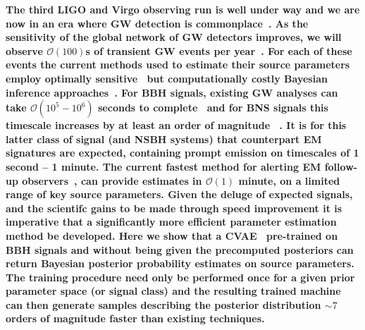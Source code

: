\documentclass[%
showpacs,
 amsmath,amssymb,
 aps,
 twocolumn,
 prl,
 reprint,
floatfix,
]{revtex4-1}
\begin{document}
%
%
%
\textbf{ 
%
%
The third \ac{LIGO} and Virgo observing run is well under way and we are now in
an era where \ac{GW} detection is commonplace~\cite{PhysRevLett.116.061102,
PhysRevX.6.041015,PhysRevLett.119.161101}. As the sensitivity of the global
network of \ac{GW} detectors improves, we will observe $\mathcal{O}(100)$s of
transient \ac{GW} events per year~\cite{1409.7215}. For each of these events
the current methods used to estimate their source parameters employ optimally
sensitive~\cite{2009CQGra..26o5017S} but computationally costly Bayesian inference
approaches~\cite{1409.7215}.
%
%
For \ac{BBH} signals, existing \ac{GW} analyses can take $\mathcal{O}(10^{5} -
10^{6})$ seconds to complete~\cite{1409.7215} and for \ac{BNS}
signals this timescale increases by at least an order of magnitude
~\cite{PhysRevLett.119.161101}. It is for this latter class of signal (and
\ac{NSBH} systems) that counterpart \ac{EM} signatures are expected, containing
prompt emission on timescales of 1 second -- 1 minute. The current fastest
method for alerting \ac{EM} follow-up observers~\cite{2016PhRvD..93b4013S}, can
provide estimates in $\mathcal{O}(1)$ minute, on a limited range of key source
parameters. Given the deluge of expected signals, and the scientifc gains to be
made through speed improvement it is imperative that a significantly more
efficient parameter estimation method be developed.
%
%
Here we show that a \ac{CVAE}~\cite{1904.06264,1812.04405} pre-trained on
\ac{BBH} signals and without being given the precomputed posteriors can return
Bayesian posterior probability estimates on source parameters. The training
procedure need only be performed once for a given prior parameter space (or
signal class) and the resulting trained machine can then generate samples
describing the posterior distribution $\sim 7$ orders of magnitude faster than
existing techniques.}
%
\end{document}
